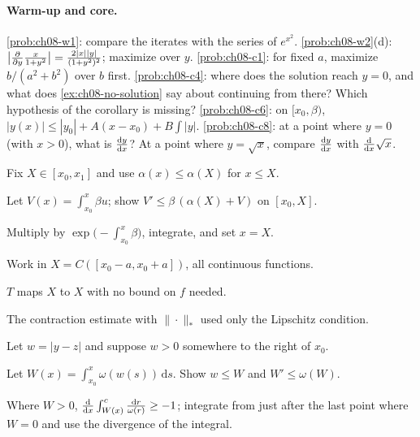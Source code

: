 \paragraph{Warm-up and core.}
\cref{prob:ch08-w1}: compare the iterates with the series of $e^{x^2}$.
\cref{prob:ch08-w2}(d): $\bigl|\frac{\partial }{\partial y}\frac{x}{1+y^2}\bigr| = \frac{2|x||y|}{(1+y^2)^2}$;
maximize over $y$.
\cref{prob:ch08-c1}: for fixed $a$, maximize $b/(a^2 + b^2)$ over $b$ first.
\cref{prob:ch08-c4}: where does the solution reach $y = 0$, and what does
\cref{ex:ch08-no-solution} say about continuing from there? Which hypothesis of
the corollary is missing?
\cref{prob:ch08-c6}: on $[x_0,\beta)$, $|y(x)|\le|y_0| + A(x - x_0) + B\int|y|$.
\cref{prob:ch08-c8}: at a point where $y = 0$ (with $x>0$), what is $\frac{\mathrm{d}y}{\mathrm{d}x}$?
At a point where $y = \sqrt x$, compare $\frac{\mathrm{d}y}{\mathrm{d}x}$ with $\frac{\mathrm{d}}{\mathrm{d}x}\sqrt x$.

\begin{hintlevels}
  \item Fix $X\in[x_0,x_1]$ and use $\alpha(x)\le\alpha(X)$ for $x\le X$.
  \item Let $V(x) = \int_{x_0}^x\beta u$; show
        $V'\le\beta\,(\alpha(X) + V)$ on $[x_0,X]$.
  \item Multiply by $\exp\bigl(-\int_{x_0}^x\beta\bigr)$, integrate, and set $x = X$.
\end{hintlevels}

\begin{hintlevels}
  \item Work in $X = C([x_0 - a,x_0 + a])$, all continuous functions.
  \item $T$ maps $X$ to $X$ with no bound on $f$ needed.
  \item The contraction estimate with $\|\cdot\|_*$ used only the Lipschitz
        condition.
\end{hintlevels}

\begin{hintlevels}
  \item Let $w = |y - z|$ and suppose $w>0$ somewhere to the right of $x_0$.
  \item Let $W(x) = \int_{x_0}^x\omega(w(s))\,\mathrm{d}s$. Show $w\le W$ and
        $W'\le\omega(W)$.
  \item Where $W>0$, $\frac{\mathrm{d}}{\mathrm{d}x}\int_{W(x)}^{c}\frac{\mathrm{d}r}{\omega(r)}\ge-1$;
        integrate from just after the last point where $W = 0$ and use the
        divergence of the integral.
\end{hintlevels}

